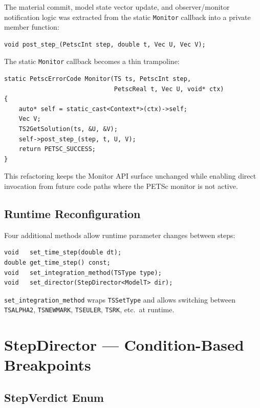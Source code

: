 The material commit, model state vector update, and observer/monitor
notification logic was extracted from the static \texttt{Monitor} callback
into a private member function:

\begin{lstlisting}
void post_step_(PetscInt step, double t, Vec U, Vec V);
\end{lstlisting}

\noindent
The static \texttt{Monitor} callback becomes a thin trampoline:

\begin{lstlisting}
static PetscErrorCode Monitor(TS ts, PetscInt step,
                              PetscReal t, Vec U, void* ctx)
{
    auto* self = static_cast<Context*>(ctx)->self;
    Vec V;
    TS2GetSolution(ts, &U, &V);
    self->post_step_(step, t, U, V);
    return PETSC_SUCCESS;
}
\end{lstlisting}

This refactoring keeps the Monitor API surface unchanged while enabling
direct invocation from future code paths where the PETSc monitor is not
active.

\subsection{Runtime Reconfiguration}

Four additional methods allow runtime parameter changes between steps:

\begin{lstlisting}
void   set_time_step(double dt);
double get_time_step() const;
void   set_integration_method(TSType type);
void   set_director(StepDirector<ModelT> dir);
\end{lstlisting}

\noindent
\texttt{set\_integration\_method} wraps \texttt{TSSetType} and allows
switching between \texttt{TSALPHA2}, \texttt{TSNEWMARK}, \texttt{TSEULER},
\texttt{TSRK}, etc.\ at runtime.

\section{StepDirector — Condition-Based Breakpoints}
\label{sec:step-director}

\subsection{StepVerdict Enum}

